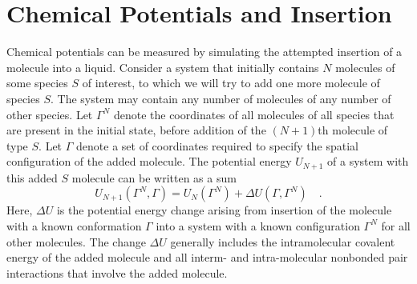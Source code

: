 \documentclass[12pt]{article}
\newcommand\system{\Gamma^{N}}
\newcommand\chain{\Gamma}
\newcommand\Utot{U_{N+1}}
\newcommand\Usys{U_{N}}
\newcommand\delU{\Delta U}
\begin{document}
\section{Chemical Potentials and Insertion}
Chemical potentials can be measured by simulating the attempted insertion of a molecule into a liquid.  Consider a system that initially contains $N$ molecules of some species $S$ of interest, to which we will try to add one more molecule of species $S$. The system may contain any number of molecules of any number of other species. Let $\system$ denote the coordinates of all molecules of all species that are present in the initial state, before addition of the $(N+1)$th molecule of type $S$. Let $\chain$ denote a set of coordinates required to specify the spatial configuration of the added molecule. The potential energy $\Utot$ of a system with this added $S$ molecule can be written as a sum 
\begin{equation}
    \Utot(\system, \chain) = \Usys(\system) + \delU (\chain, \system) 
    \quad.
\end{equation}
Here, $\delU$ is the potential energy change arising from insertion of the molecule with a known conformation $\chain$ into a system with a known configuration $\system$ for all other molecules. The change $\delU$ generally includes the intramolecular covalent energy of the added molecule and all interm- and intra-molecular nonbonded pair interactions that involve the added molecule. 
\end{document}
